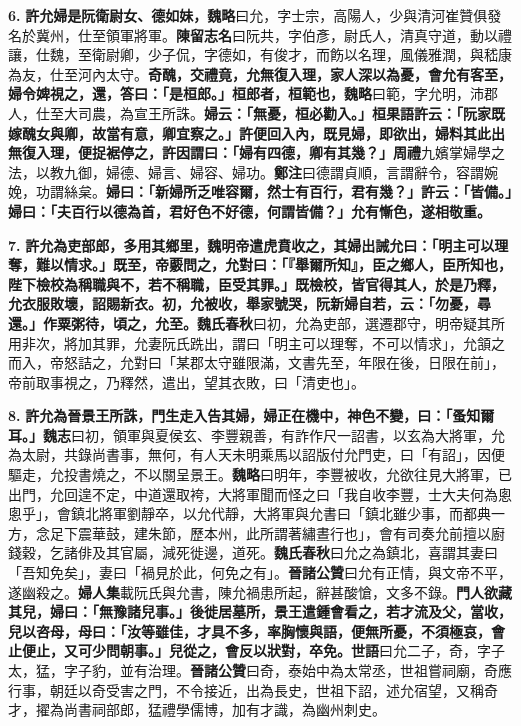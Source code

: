 \textbf{6.} \textbf{許允婦是阮衛尉女、德如妹，}{\footnotesize \textbf{魏略}曰允，字士宗，高陽人，少與清河崔贊俱發名於冀州，仕至領軍將軍。\textbf{陳留志名}曰阮共，字伯彥，尉氏人，清真守道，動以禮讓，仕魏，至衛尉卿，少子侃，字德如，有俊才，而飭以名理，風儀雅潤，與嵇康為友，仕至河內太守。}\textbf{奇醜，交禮竟，允無復入理，家人深以為憂，會允有客至，婦令婢視之，還，答曰：「是桓郎。」桓郎者，桓範也，}{\footnotesize \textbf{魏略}曰範，字允明，沛郡人，仕至大司農，為宣王所誅。}\textbf{婦云：「無憂，桓必勸入。」桓果語許云：「阮家既嫁醜女與卿，故當有意，卿宜察之。」許便回入內，既見婦，即欲出，婦料其此出無復入理，便捉裾停之，許因謂曰：「婦有四德，卿有其幾？」}{\footnotesize \textbf{周禮}九嬪掌婦學之法，以教九御，婦德、婦言、婦容、婦功。\textbf{鄭注}曰德謂貞順，言謂辭令，容謂婉娩，功謂絲枲。}\textbf{婦曰：「新婦所乏唯容爾，然士有百行，君有幾？」許云：「皆備。」婦曰：「夫百行以德為首，君好色不好德，何謂皆備？」允有慚色，遂相敬重。}

\textbf{7.} \textbf{許允為吏部郎，多用其鄉里，魏明帝遣虎賁收之，其婦出誡允曰：「明主可以理奪，難以情求。」既至，帝覈問之，允對曰：「『舉爾所知』，臣之鄉人，臣所知也，陛下檢校為稱職與不，若不稱職，臣受其罪。」既檢校，皆官得其人，於是乃釋，允衣服敗壞，詔賜新衣。初，允被收，舉家號哭，阮新婦自若，云：「勿憂，尋還。」作粟粥待，頃之，允至。}{\footnotesize \textbf{魏氏春秋}曰初，允為吏部，選遷郡守，明帝疑其所用非次，將加其罪，允妻阮氏跣出，謂曰「明主可以理奪，不可以情求」，允頷之而入，帝怒詰之，允對曰「某郡太守雖限滿，文書先至，年限在後，日限在前」，帝前取事視之，乃釋然，遣出，望其衣敗，曰「清吏也」。}

\textbf{8.} \textbf{許允為晉景王所誅，門生走入告其婦，婦正在機中，神色不變，曰：「蚤知爾耳。」}{\footnotesize \textbf{魏志}曰初，領軍與夏侯玄、李豐親善，有詐作尺一詔書，以玄為大將軍，允為太尉，共錄尚書事，無何，有人天未明乘馬以詔版付允門吏，曰「有詔」，因便驅走，允投書燒之，不以關呈景王。\textbf{魏略}曰明年，李豐被收，允欲往見大將軍，已出門，允回遑不定，中道還取袴，大將軍聞而怪之曰「我自收李豐，士大夫何為悤悤乎」，會鎮北將軍劉靜卒，以允代靜，大將軍與允書曰「鎮北雖少事，而都典一方，念足下震華鼓，建朱節，歷本州，此所謂著繡晝行也」，會有司奏允前擅以廚錢穀，乞諸俳及其官屬，減死徙邊，道死。\textbf{魏氏春秋}曰允之為鎮北，喜謂其妻曰「吾知免矣」，妻曰「禍見於此，何免之有」。\textbf{晉諸公贊}曰允有正情，與文帝不平，遂幽殺之。\textbf{婦人集}載阮氏與允書，陳允禍患所起，辭甚酸愴，文多不錄。}\textbf{門人欲藏其兒，婦曰：「無豫諸兒事。」後徙居墓所，景王遣鍾會看之，若才流及父，當收，兒以咨母，母曰：「汝等雖佳，才具不多，率胸懷與語，便無所憂，不須極哀，會止便止，又可少問朝事。」兒從之，會反以狀對，卒免。}{\footnotesize \textbf{世語}曰允二子，奇，字子太，猛，字子豹，並有治理。\textbf{晉諸公贊}曰奇，泰始中為太常丞，世祖嘗祠廟，奇應行事，朝廷以奇受害之門，不令接近，出為長史，世祖下詔，述允宿望，又稱奇才，擢為尚書祠部郎，猛禮學儒博，加有才識，為幽州刺史。}

